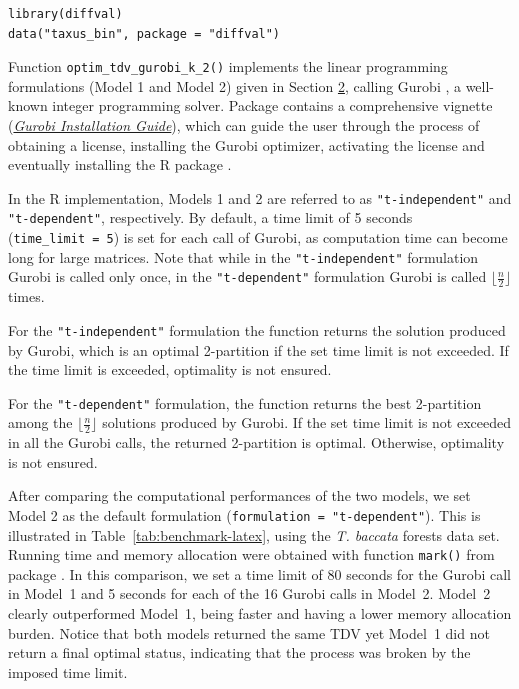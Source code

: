 \begin{verbatim}
library(diffval)
data("taxus_bin", package = "diffval")
\end{verbatim}

Function \texttt{optim\_tdv\_gurobi\_k\_2()} implements the linear programming formulations (Model 1 and Model 2) given in Section \hyperref[casemtwo]{2}, calling Gurobi \citep{gurobi}, a well-known integer programming solver. Package  \citep{HSM2022} contains a comprehensive vignette (\href{https://prioritizr.net/articles/gurobi_installation_guide.html}{\emph{Gurobi Installation Guide}}), which can guide the user through the process of obtaining a license, installing the Gurobi optimizer, activating the license and eventually installing the R package .

In the R implementation, Models 1 and 2 are referred to as \texttt{"t-independent"} and \texttt{"t-dependent"}, respectively. By default, a time limit of 5 seconds (\texttt{time\_limit\ =\ 5}) is set for each call of Gurobi, as computation time can become long for large matrices. Note that while in the \texttt{"t-independent"} formulation Gurobi is called only once, in the \texttt{"t-dependent"} formulation Gurobi is called \(\lfloor\frac{n}{2}\rfloor\) times.

For the \texttt{"t-independent"} formulation the function returns the solution produced by Gurobi, which is an optimal 2-partition if the set time limit is not exceeded. If the time limit is exceeded, optimality is not ensured.

For the \texttt{"t-dependent"} formulation, the function returns the best 2-partition among the \(\lfloor\frac{n}{2}\rfloor\) solutions produced by Gurobi. If the set time limit is not exceeded in all the Gurobi calls, the returned 2-partition is optimal. Otherwise, optimality is not ensured.

After comparing the computational performances of the two models, we set Model 2 as the default formulation (\texttt{formulation\ =\ "t-dependent"}). This is illustrated in Table~\ref{tab:benchmark-latex}, using the \emph{T. baccata} forests data set. Running time and memory allocation were obtained with function \texttt{mark()} from package  \citep{HV2021}. In this comparison, we set a time limit of 80 seconds for the Gurobi call in Model~1 and 5 seconds for each of the 16 Gurobi calls in Model~2. Model~2 clearly outperformed Model~1, being faster and having a lower memory allocation burden. Notice that both models returned the same TDV yet Model~1 did not return a final optimal status, indicating that the process was broken by the imposed time limit.

